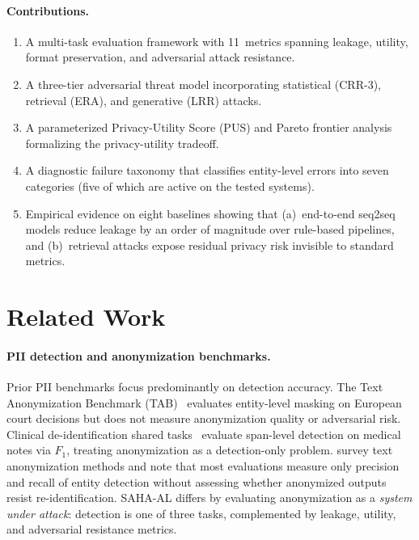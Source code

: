 \documentclass[10pt,twocolumn]{article}
\begin{document}
\paragraph{Contributions.}
\begin{enumerate}
\item A multi-task evaluation framework with 11~metrics spanning leakage, utility, format preservation, and adversarial attack resistance.
\item A three-tier adversarial threat model incorporating statistical (CRR-3), retrieval (ERA), and generative (LRR) attacks.
\item A parameterized Privacy-Utility Score (PUS) and Pareto frontier analysis formalizing the privacy-utility tradeoff.
\item A diagnostic failure taxonomy that classifies entity-level errors into seven categories (five of which are active on the tested systems).
\item Empirical evidence on eight baselines showing that (a)~end-to-end seq2seq models reduce leakage by an order of magnitude over rule-based pipelines, and (b)~retrieval attacks expose residual privacy risk invisible to standard metrics.
\end{enumerate}

\section{Related Work}\label{sec:related}

\paragraph{PII detection and anonymization benchmarks.}
Prior PII benchmarks focus predominantly on detection accuracy.
The Text Anonymization Benchmark (TAB)~\citep{pilan2022tab} evaluates entity-level masking on European court decisions but does not measure anonymization quality or adversarial risk.
Clinical de-identification shared tasks~\citep{stubbs2015} evaluate span-level detection on medical notes via $F_1$, treating anonymization as a detection-only problem.
\citet{lison2021} survey text anonymization methods and note that most evaluations measure only precision and recall of entity detection without assessing whether anonymized outputs resist re-identification.
SAHA-AL differs by evaluating anonymization as a \emph{system under attack}: detection is one of three tasks, complemented by leakage, utility, and adversarial resistance metrics.
\end{document}
